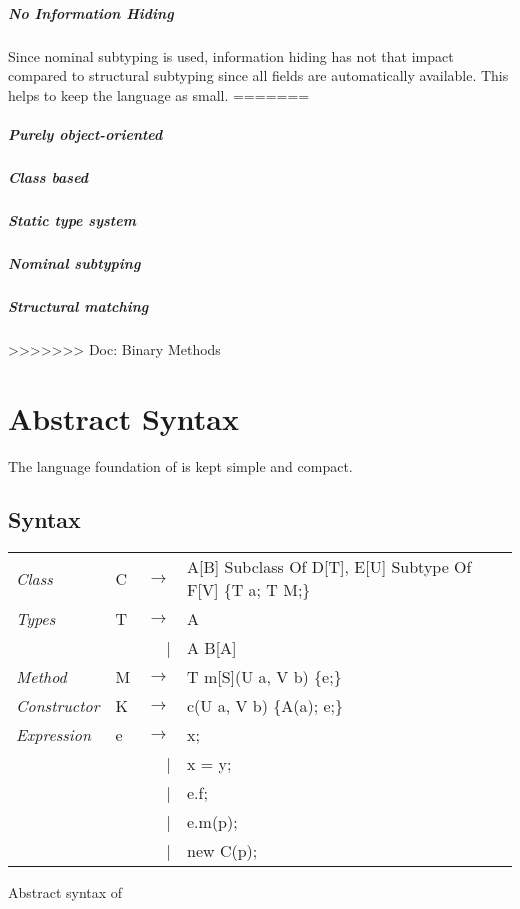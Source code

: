 \paragraph{No Information Hiding}
Since nominal subtyping is used, information hiding has not that impact
compared to structural subtyping since all fields are automatically
available. This helps to keep the language as small.
=======
\cite{gawecki_tool:_1995}
\paragraph{Purely object-oriented}
\paragraph{Class based}
\paragraph{Static type system}
\paragraph{Nominal subtyping}
\paragraph{Structural matching}

>>>>>>> Doc: Binary Methods

\chapter{Abstract Syntax}
The language foundation of \ooplss is kept simple and compact. 

\section{Syntax}
\begin{listing}
	\begin{tabular}[H]{llrll}
		\emph{Class}					& C	& $\longrightarrow$ 		& A[B] Subclass Of D[T], E[U] Subtype Of F[V] \{T a; T M;\} \\
		\emph{Types}					& T & $\longrightarrow$ 		& A \\
													&   & 									 | & A \match B[A] \\
		\emph{Method}					& M	& $\longrightarrow$ 		& T m[S](U a, V b) \{e;\} \\
		\emph{Constructor}		& K	& $\longrightarrow$ 		& c(U a, V b) \{A(a); e;\} \\
		\emph{Expression}			& e & $\longrightarrow$ 		& x; \\
													&   & 									 | & x = y; \\
													&   & 									 | & e.f; \\
													&   & 									 | & e.m(p); \\
													&   & 									 | & new C(p); \\
	\end{tabular}
\caption{Abstract syntax of \ooplss}
\label{lst:abstractSyntax}
\end{listing}

